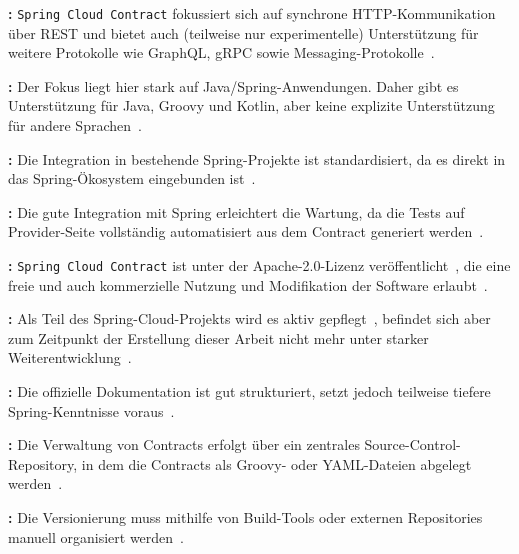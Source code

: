 \textbf{:} \texttt{Spring Cloud Contract} fokussiert sich auf synchrone \gls{HTTP}-Kommunikation über \gls{REST} und bietet auch (teilweise nur experimentelle) Unterstützung für weitere Protokolle wie \gls{GraphQL}, \gls{gRPC} sowie Messaging-Protokolle~\cite{SpringCloudContractb}.

\textbf{:} Der Fokus liegt hier stark auf Java/Spring-Anwendungen.
Daher gibt es Unterstützung für Java, Groovy und Kotlin, aber keine explizite Unterstützung für andere Sprachen~\cite{SpringCloudContractb}.

\textbf{:} Die Integration in bestehende \gls{Spring}-Projekte ist standardisiert, da es direkt in das \gls{Spring}-Ökosystem eingebunden ist~\cite{SpringCloudContracta}.

\textbf{:} Die gute Integration mit \gls{Spring} erleichtert die Wartung, da die Tests auf Provider-Seite vollständig automatisiert aus dem Contract generiert werden~\cite{SpringCloudContractb}.

\textbf{:} \texttt{Spring Cloud Contract} ist unter der Apache-2.0-Lizenz veröffentlicht~\cite{SpringcloudSpringcloudcontract2025}, die eine freie und auch kommerzielle Nutzung und Modifikation der Software erlaubt~\cite{ApacheLicenseVersion}.

\textbf{:} Als Teil des \gls{Spring}-Cloud-Projekts wird es aktiv gepflegt~\cite{SpringCloudContracta}, befindet sich aber zum Zeitpunkt der Erstellung dieser Arbeit nicht mehr unter starker Weiterentwicklung~\cite{SpringcloudSpringcloudcontract2025}.

\textbf{:} Die offizielle Dokumentation ist gut strukturiert, setzt jedoch teilweise tiefere Spring-Kenntnisse voraus~\cite{SpringCloudContractb}.

\textbf{:} Die Verwaltung von Contracts erfolgt über ein zentrales Source-Control-Repository, in dem die Contracts als Groovy- oder \gls{YAML}-Dateien abgelegt werden~\cite{SpringCloudContractb}.

\textbf{:} Die Versionierung muss mithilfe von \gls{Build}-Tools oder externen Repositories manuell organisiert werden~\cite{SpringCloudContractb}.

